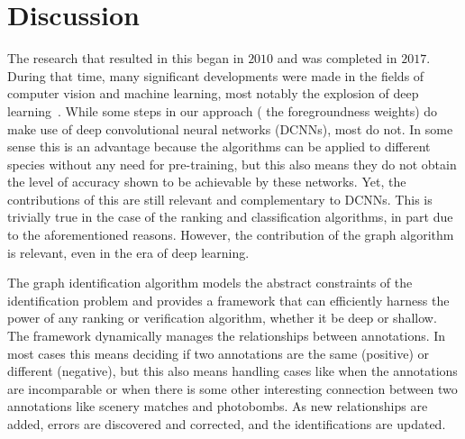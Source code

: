     \section{Discussion}\label{sec:discuss}

    The research that resulted in this \thesis{} began in $2010$ and was completed in $2017$.
    During that time, many significant developments were made in the fields of computer vision and machine
      learning, most notably the explosion of deep learning~\cite{lecun_deep_2015}.
    While some steps in our approach (\eg{} the foregroundness weights) do make use of deep convolutional neural
      networks (DCNNs), most do not.
    In some sense this is an advantage because the algorithms can be applied to different species without any
      need for pre-training, but this also means they do not obtain the level of accuracy shown to be achievable by
      these networks.
    Yet, the contributions of this \thesis{} are still relevant and complementary to DCNNs.
    This is trivially true in the case of the ranking and classification algorithms, in part due to the
      aforementioned reasons.
    However, the contribution of the graph algorithm is relevant, even in the era of deep learning.
    
    The graph identification algorithm models the abstract constraints of the identification problem and provides
      a framework that can efficiently harness the power of any ranking or verification algorithm, whether it be
      deep or shallow.
    The framework dynamically manages the relationships between annotations.
    In most cases this means deciding if two annotations are the same (positive) or different (negative), but
      this also means handling cases like when the annotations are incomparable or when there is some other
      interesting connection between two annotations like scenery matches and photobombs.
    As new relationships are added, errors are discovered and corrected, and the identifications are updated.


